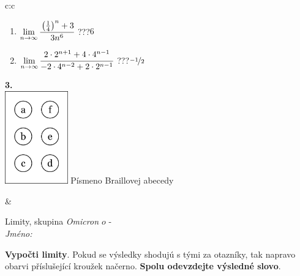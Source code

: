 \documentclass[10pt]{report}
\newcommand\omicron{o}
\begin{document}
\begin{tabular}{c:c}
\begin{minipage}[c][104.5mm][t]{0.5\linewidth}
\begin{center}
\begin{minipage}{0.79\linewidth}
\begin{center}
\begin{varwidth}{\linewidth}
\begin{enumerate}
\item $\lim\limits_{n\to\infty}\cfrac{\left(\frac{1}{4}\right)^n +3}{3n^{6}}$\quad \dotfill\; ???\;\dotfill \quad $6$
\item $\lim\limits_{n\to\infty}\cfrac{2\cdot 2^{n+1}+4\cdot 4^{n-1}}{-2\cdot 4^{n-2}+2\cdot 2^{n-1}}$\quad \dotfill\; ???\;\dotfill \quad $\nicefrac{-1}{2}$
\end{enumerate}
\end{varwidth}
\end{center}
\end{minipage}
\begin{minipage}{0.20\linewidth}
\begin{center}
{\Huge\bfseries 3.} \\[2mm]
\includegraphics[height=40mm]{../images/braille.png}
{\small Písmeno Braillovej abecedy}
\end{center}
\end{minipage}
\end{center}
\end{minipage}
&
\begin{minipage}[c][104.5mm][t]{0.5\linewidth}
\begin{center}
\vspace{7mm}
{\huge Limity, skupina \textit{Omicron $\omicron$} -}\\[5mm]
\textit{Jméno:}\phantom{xxxxxxxxxxxxxxxxxxxxxxxxxxxxxxxxxxxxxxxxxxxxxxxxxxxxxxxxxxxxxxxxx}\\[5mm]
\begin{minipage}{0.95\linewidth}
\begin{center}
\textbf{Vypočti limity}. Pokud se výsledky shodujú s tými za otazníky, tak napravo\\obarvi příslušející kroužek načerno. \textbf{Spolu odevzdejte výsledné slovo}.
\end{center}
\end{minipage}
\\[1mm]
\begin{minipage}{0.79\linewidth}
\begin{center}
\begin{varwidth}{\linewidth}

\end{varwidth}
\end{center}
\end{minipage}
\end{center}
\end{minipage}
\end{tabular}
\end{document}
